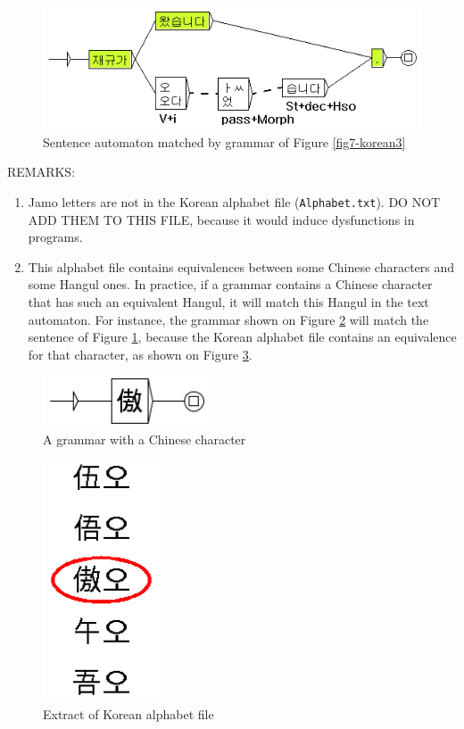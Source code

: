 \begin{figure}[!ht]
\begin{center}
\includegraphics[width=13cm]{resources/img/fig7-korean4.png}
\caption{Sentence automaton matched by grammar of
Figure \ref{fig7-korean3}\label{fig7-korean4}}
\end{center}
\end{figure}

\bigskip
\noindent REMARKS: 
\begin{enumerate}
    \item Jamo letters are not in the Korean alphabet file
    (\verb+Alphabet.txt+). DO NOT ADD THEM TO THIS FILE, because it
    would induce dysfunctions in programs.
    
    \item This alphabet file contains equivalences between some Chinese
    characters and some Hangul ones. In practice, if a grammar contains a
    Chinese character that has such an equivalent Hangul, it will match this
    Hangul in the text automaton. For instance, the grammar shown on Figure
    \ref{fig7-korean5} will match the sentence of Figure \ref{fig7-korean4},
    because the Korean alphabet file contains an equivalence for that
    character, as shown on Figure \ref{fig7-korean6}.
\end{enumerate}

\begin{figure}[!ht]
\begin{center}
\includegraphics[width=5cm]{resources/img/fig7-korean5.png}
\caption{A grammar with a Chinese character\label{fig7-korean5}}
\end{center}
\end{figure}

\begin{figure}[!ht]
\begin{center}
\includegraphics[width=3.5cm]{resources/img/fig7-korean6.png}
\caption{Extract of Korean alphabet file\label{fig7-korean6}}
\end{center}
\end{figure}